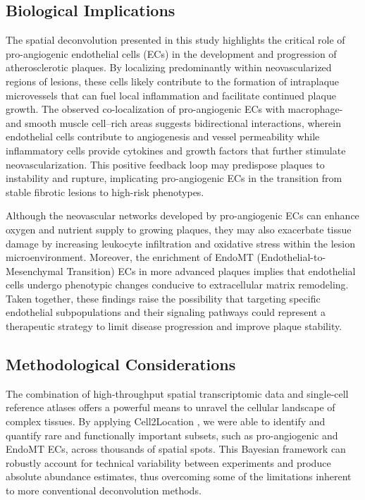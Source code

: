 \documentclass[a4paper,12pt]{article}
\begin{document}
\subsection{Biological Implications}
The spatial deconvolution presented in this study highlights the critical role of pro-angiogenic endothelial cells (ECs) in the development and progression of atherosclerotic plaques. By localizing predominantly within neovascularized regions of lesions, these cells likely contribute to the formation of intraplaque microvessels that can fuel local inflammation and facilitate continued plaque growth. The observed co-localization of pro-angiogenic ECs with macrophage- and smooth muscle cell–rich areas suggests bidirectional interactions, wherein endothelial cells contribute to angiogenesis and vessel permeability while inflammatory cells provide cytokines and growth factors that further stimulate neovascularization. This positive feedback loop may predispose plaques to instability and rupture, implicating pro-angiogenic ECs in the transition from stable fibrotic lesions to high-risk phenotypes.

Although the neovascular networks developed by pro-angiogenic ECs can enhance oxygen and nutrient supply to growing plaques, they may also exacerbate tissue damage by increasing leukocyte infiltration and oxidative stress within the lesion microenvironment. Moreover, the enrichment of EndoMT (Endothelial-to-Mesenchymal Transition) ECs in more advanced plaques implies that endothelial cells undergo phenotypic changes conducive to extracellular matrix remodeling. Taken together, these findings raise the possibility that targeting specific endothelial subpopulations and their signaling pathways could represent a therapeutic strategy to limit disease progression and improve plaque stability.

\subsection{Methodological Considerations}
The combination of high-throughput spatial transcriptomic data and single-cell reference atlases offers a powerful means to unravel the cellular landscape of complex tissues. By applying Cell2Location \citep{Kleshchevnikov2022-vd}, we were able to identify and quantify rare and functionally important subsets, such as pro-angiogenic and EndoMT ECs, across thousands of spatial spots. This Bayesian framework can robustly account for technical variability between experiments and produce absolute abundance estimates, thus overcoming some of the limitations inherent to more conventional deconvolution methods.
\end{document}
